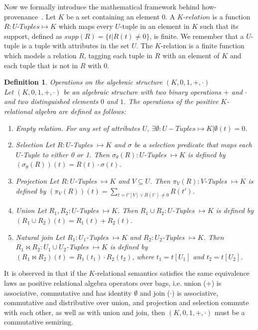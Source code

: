 \documentclass[preprint,12pt,sort&compress]{elsarticle}
\newtheorem{definition}{Definition}[section]
\begin{document}
 Now we formally introduce the mathematical framework behind how-provenance~\cite{howProvenanceGreen}.
Let $K$ be a set containing an element $0$. 
A $K$-$relation$ is a function $R: U$-$Tuples \mapsto K$ which maps every $U$-tuple in an element in $K$ such that its support, defined as $supp(R) = \{t | R(t) \neq 0\}$, is finite. 
We remember that a $U$-tuple is a tuple with attributes in the set $U$. The $K$-relation is a finite function which models a relation $R$, tagging each tuple in $R$ with an element of $K$ and each tuple that is not in $R$ with $0$.
\begin{definition}{Operations on the algebraic structure $(K, 0, 1, +, \cdot)$\cite{howProvenanceGreen}}\\
\label{definition:how_original}
	Let $(K, 0, 1, +, \cdot)$ be an algebraic structure with two binary operations $+$ and $\cdot$ and two distinguished elements $0$ and $1$. The operations of the positive $K$-relational algebra are defined as follows:
	\begin{enumerate}
		\item \textsf{Empty relation}. For any set of attributes $U$, $\exists \emptyset: U-Tuples \mapsto K | \emptyset(t) = 0$.
		\item \textsf{Selection} Let $R: U$-Tuples $\mapsto K$ and $\sigma$ be a selection predicate that maps each $U$-Tuple to either 0 or 1. Then $\sigma_\theta(R): U$-Tuples $\mapsto K$ is defined by $(\sigma_\theta(R))(t) = R(t) \cdot \sigma(t)$. 
		\item \textsf{Projection} Let $R: U$-Tuples $\mapsto K$ and $V \subseteq U$. Then $\pi_V(R): V$-Tuples $\mapsto K$ is defined by $(\pi_V(R))(t) = \sum_{t = t'[V] \vee R(t') \neq 0 }R(t')$.
		\item \textsf{Union} Let $R_1, R_2: U$-Tuples $\mapsto K$. Then $R_1 \cup R_2: U$-Tuples $\mapsto K$ is defined by $(R_1 \cup R_2)(t) = R_1(t) + R_2(t)$.
		\item \textsf{Natural join} Let $R_1: U_1$-Tuples $\mapsto K$ and $R_2: U_2$-Tuples $\mapsto K$. Then $R_1 \Join R_2: U_1 \cup U_2$-Tuples $\mapsto K$ is defined by $(R_1 \Join R_2)(t) = R_1(t_1) \cdot R_2(t_2)$, where $t_1 = t[U_1]$ and $t_2 = t[U_2]$.
	\end{enumerate}
\end{definition}

It is observed in \cite{howProvenanceGreen, CheneyProvSurvey} that if the $K$-relational semantics satisfies the same equivalence laws as positive relational algebra operators over bags, i.e. union (+) is associative, commutative and has identity $\emptyset$ and join ($\cdot$) is associative, commutative and distributive over union, and projection and selection commute with each other, as well as with union and join, then $(K, 0, 1, +, \cdot)$ must be a commutative semiring. 
\end{document}
